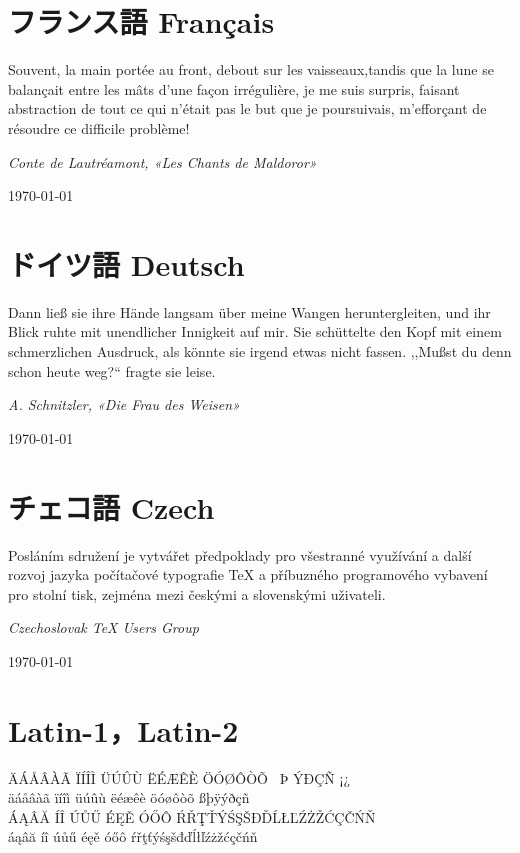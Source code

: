 \documentclass{ujarticle}
\begin{document}
\section{フランス語 Français}
Souvent, la main portée au front, debout sur les 
vaisseaux,tandis que la lune se balançait entre 
les mâts d'une façon irrégulière, je me suis surpris, 
faisant abstraction de tout ce qui n'était pas le but 
que je poursuivais, m'efforçant de résoudre ce 
difficile problème!

\hfill {\em Conte de Lautréamont, «Les Chants de Maldoror»}%
\qquad\qquad

\hfill\today


\section{ドイツ語 Deutsch}
Dann ließ sie ihre Hände langsam über meine Wangen
heruntergleiten, und ihr Blick ruhte mit unendlicher
Innigkeit auf mir.
Sie schüttelte den Kopf mit einem schmerzlichen Ausdruck,
als könnte sie irgend etwas nicht fassen.
,,Mußst du denn schon heute weg?{}`` 
fragte sie leise.

\hfill {\em A. Schnitzler, «Die Frau des Weisen»}%
\qquad\qquad

\hfill\today


%
\section{チェコ語 Czech}
Posláním sdružení je vytvářet předpoklady 
pro všestranné využívání a další rozvoj jazyka 
počítačové typografie \TeX{} a příbuzného programového 
vybavení pro stolní tisk, 
zejména mezi českými a slovenskými uživateli.

\hfill {\em Czechoslovak \TeX{} Users Group}%
\qquad\qquad

\hfill\today


\section{Latin-1，Latin-2}
ÄÁÅÂÀÃ ÏÍÎÌ ÜÚÛÙ ËÉÆÊÈ ÖÓØÔÒÕ ~Þ ÝÐÇÑ ¡¿\\
äáåâàã ïíîì üúûù ëéæêè öóøôòõ ßþÿýðçñ\\
ÁĄÂĂ ÍÎ Ú{Ů}Ű ÉĘĚ ÓŐÔ 
ŔŘŢŤÝŚŞŠĐĎĹŁĽŹŻŽĆÇČŃŇ\\
áąâă íî ú{ů}ű éęě óőô 
ŕřţťýśşšđďĺłľźżžćçčńň
\end{document}
